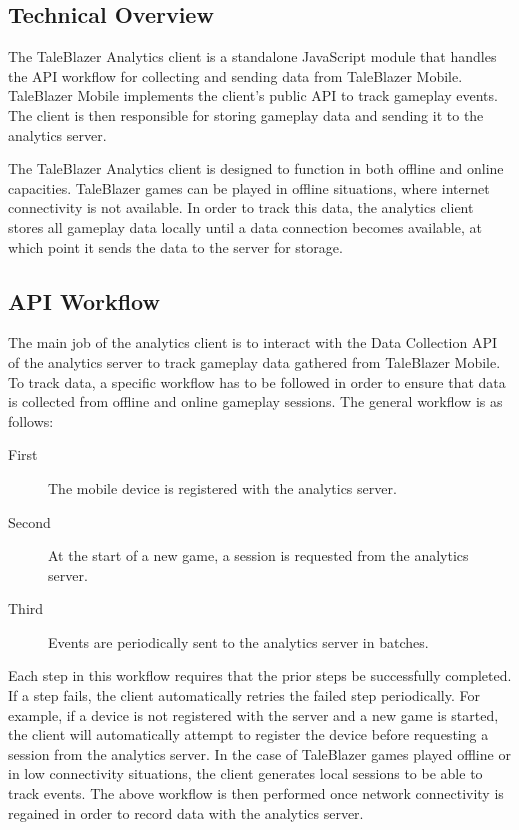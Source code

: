 \subsection{Technical Overview}

The TaleBlazer Analytics client is a standalone JavaScript module that handles the API workflow for collecting and sending data from TaleBlazer Mobile. TaleBlazer Mobile implements the client's public API to track gameplay events. The client is then responsible for storing gameplay data and sending it to the analytics server.

The TaleBlazer Analytics client is designed to function in both offline and online capacities. TaleBlazer games can be played in offline situations, where internet connectivity is not available. In order to track this data, the analytics client stores all gameplay data locally until a data connection becomes available, at which point it sends the data to the server for storage.

\subsection{API Workflow}
\label{subsec:api_workflow}

The main job of the analytics client is to interact with the Data Collection API of the analytics server to track gameplay data gathered from TaleBlazer Mobile. To track data, a specific workflow has to be followed in order to ensure that data is collected from offline and online gameplay sessions. The general workflow is as follows:
\medskip
	\begin{description}
		\item[First] The mobile device is registered with the analytics server.
		\item[Second] At the start of a new game, a session is requested from the analytics server.
		\item[Third] Events are periodically sent to the analytics server in batches.
	\end{description}
\medskip

Each step in this workflow requires that the prior steps be successfully completed. If a step fails, the client automatically retries the failed step periodically. For example, if a device is not registered with the server and a new game is started, the client will automatically attempt to register the device before requesting a session from the analytics server. In the case of TaleBlazer games played offline or in low connectivity situations, the client generates local sessions to be able to track events. The above workflow is then performed once network connectivity is regained in order to record data with the analytics server.

